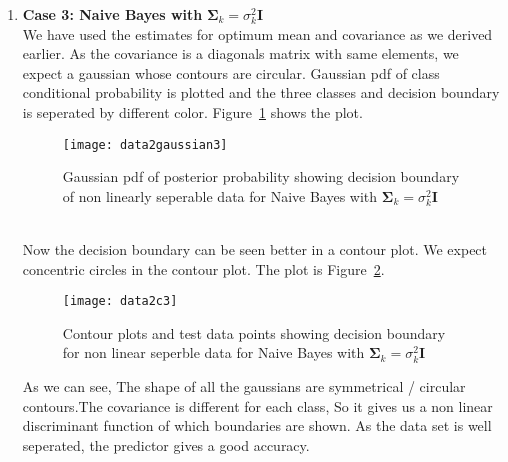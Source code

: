 \documentclass[11pt,paper=a4,answers]{exam}
\begin{document}
\begin{questions}
\begin{enumerate}[i.]
\begin{enumerate}
            \item \textbf{Case 3: Naive Bayes with} $\bm{\Sigma}_k = \sigma_k^2\bm{I}$\\
            We have used the estimates for optimum mean and covariance as we derived earlier. As the covariance is a diagonals matrix with same elements, we expect a gaussian whose contours are circular. Gaussian pdf of class conditional probability is plotted and the three classes and decision boundary is seperated by different color. Figure~\ref{fig:data2g3} shows the plot.
            \begin{figure}[ht]
                \centering
                \texttt{[image: data2gaussian3]}
                \vspace{-30pt}
                \caption{Gaussian pdf of posterior probability showing decision boundary of non linearly seperable data for Naive Bayes with $\bm{\Sigma}_k = \sigma_k^2\bm{I}$}
                \label{fig:data2g3}
            \end{figure}\\
            Now the decision boundary can be seen better in a contour plot. We expect concentric circles in the contour plot. The plot is Figure~\ref{fig:data2c3}.\\ 
            \begin{figure}[ht]
                \centering
                \texttt{[image: data2c3]}
                \vspace{-30pt}
                \caption{Contour plots and test data points showing decision boundary for non linear seperble data for Naive Bayes with $\bm{\Sigma}_k = \sigma_k^2\bm{I}$}
                \label{fig:data2c3}
            \end{figure}
            As we can see, The shape of all the gaussians are symmetrical / circular contours.The covariance is different for each class, So it gives us a non linear discriminant function of which boundaries are shown. As the data set is well seperated, the predictor gives a good accuracy.\\


\end{enumerate}
\end{enumerate}
\end{questions}
\end{document}
